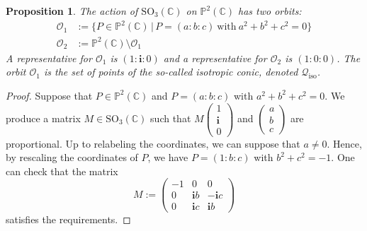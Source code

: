 \documentclass{amsart}
\theoremstyle{plain}
\newtheorem{prop}[lemma]{Proposition}
\theoremstyle{definition}
\newcommand{\C}{\mathbb{C}}
\newcommand{\p}{\mathbb{P}}
\newcommand{\iso}{\mathcal{Q}_{\mathrm{iso}}}
\newcommand{\iii}{\textbf{i}}
\begin{document}
\begin{prop}
\label{two_orbits}
 The action of $\mathrm{SO}_3(\mathbb{C})$ on $\p^2(\C)$ has two orbits:
 \begin{align*}
  \mathcal{O}_1 &:=
  \bigl\{
   P \in \p^2(\C) \, | \,
   P = (a:b:c) \  \text{with} \  a^2 + b^2 + c^2 = 0
  \bigr\} \\
  \mathcal{O}_2 &:= \p^2(\C) \setminus \mathcal{O}_1
 \end{align*}
 A representative for $\mathcal{O}_1$ is $(1:\iii:0)$ and a
representative for $\mathcal{O}_2$ is $(1:0:0)$.
The orbit $\mathcal{O}_1$ is the set of points of the so-called \emph{isotropic conic}, denoted $\iso$.
\end{prop}
\begin{proof}
 Suppose that $P \in \p^2(\C)$ and $P = (a:b:c)$ with $a^2 + b^2 + c^2 = 0$.
 We produce a matrix $M \in \mathrm{SO}_3(\C)$ such that $M \left(\begin{smallmatrix} 1 \\ \iii \\ 0 \end{smallmatrix}\right)$ and $\left(\begin{smallmatrix} a \\ b \\ c \end{smallmatrix}\right)$ are proportional.
 Up to relabeling the coordinates, we can suppose that $a \neq 0$.
 Hence, by rescaling the coordinates of $P$, we have $P = (1: b: c)$ with $b^2 + c^2 = -1$.
 One can check that the matrix
 \[
  M :=
  \begin{pmatrix}
   -1 & 0 & 0 \\
   0 & \iii b & -\iii c \\
   0 & \iii c & \iii b
  \end{pmatrix}
 \]
 satisfies the requirements.


\end{proof}
\end{document}
